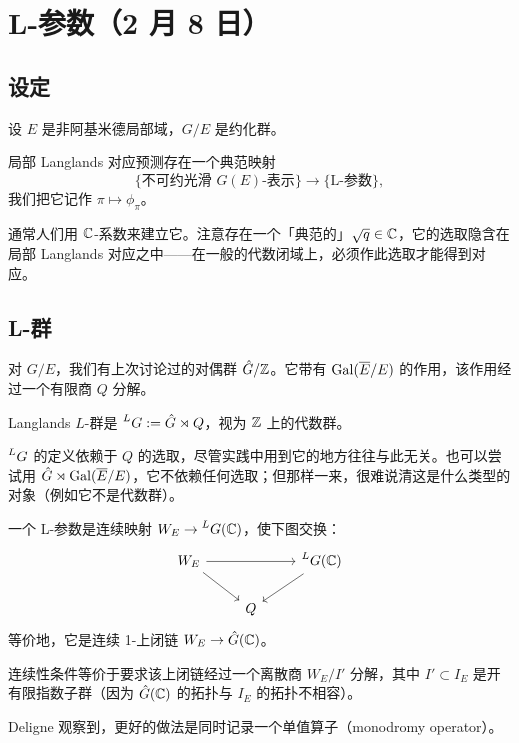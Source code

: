 \section[L-参数]{L-参数（2 月 8 日）}


\subsection{设定}

设 $E$ 是非阿基米德局部域，$G/E$ 是约化群。

局部 Langlands 对应预测存在一个典范映射
\[
\{\text{不可约光滑 }G(E)\text{-表示}\}\longrightarrow\{\text{L-参数}\},
\]
我们把它记作 $\pi\mapsto\phi_\pi$。

通常人们用 $\mathbb{C}$-系数来建立它。注意存在一个「典范的」$\sqrt q\in\mathbb{C}$，它的选取隐含在局部 Langlands 对应之中——在一般的代数闭域上，必须作此选取才能得到对应。

\subsection{L-群}

对 $G/E$，我们有上次讨论过的对偶群 $\hat G/\mathbb{Z}$。它带有 $\operatorname{Gal}(\overline{E}/E)$ 的作用，该作用经过一个有限商 $Q$ 分解。

\begin{definition}
Langlands $L$-群是 $\prescript{L}{}{G}:=\hat G\rtimes Q$，视为 $\mathbb{Z}$ 上的代数群。
\end{definition}

\begin{remark}
$\prescript{L}{}{G}$ 的定义依赖于 $Q$ 的选取，尽管实践中用到它的地方往往与此无关。也可以尝试用 $\hat G\rtimes\operatorname{Gal}(\overline{E}/E)$，它不依赖任何选取；但那样一来，很难说清这是什么类型的对象（例如它不是代数群）。
\end{remark}

\begin{definition}[L-参数，第一种取法]
一个 L-参数是连续映射 $W_E\to\prescript{L}{}{G}(\mathbb{C})$，使下图交换：
\[
\begin{tikzcd}
W_E \arrow[rr] \arrow[dr] & & \prescript{L}{}{G}(\CC) \arrow[dl] \\
& Q &
\end{tikzcd}
\]
等价地，它是连续 1-上闭链 $W_E\to\hat G(\mathbb{C})$。
\end{definition}

\begin{remark}
连续性条件等价于要求该上闭链经过一个离散商 $W_E/I'$ 分解，其中 $I'\subset I_E$ 是开有限指数子群（因为 $\hat G(\mathbb{C})$ 的拓扑与 $I_E$ 的拓扑不相容）。

Deligne 观察到，更好的做法是同时记录一个单值算子（monodromy operator）。
\end{remark}

